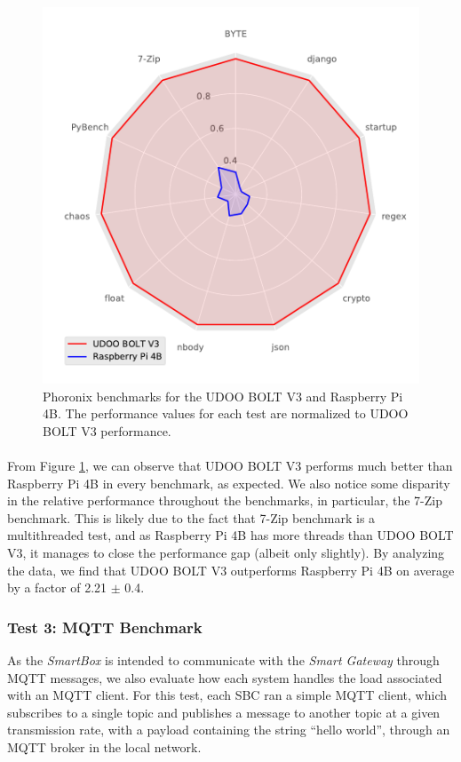 \begin{figure}[H]
    \centering
    \includegraphics[width=0.8 \linewidth]{images/phoronix-benchmarks.pdf}
    \caption [Phoronix benchmarks for the UDOO BOLT V3 and Raspberry Pi 4B.]{ Phoronix benchmarks for the UDOO BOLT V3 and Raspberry Pi 4B. The performance values for each test are normalized to UDOO BOLT V3 performance.}
    \label{fig:phronix-benchmarks}
\end{figure}

\paragraph{} From Figure \ref{fig:phronix-benchmarks}, we can observe that UDOO BOLT V3 performs much better than Raspberry Pi 4B in every benchmark, as expected. We also notice some disparity in the relative performance throughout the benchmarks, in particular, the 7-Zip benchmark. This is likely due to the fact that 7-Zip benchmark is a multithreaded test, and as Raspberry Pi 4B has more threads than UDOO BOLT V3, it manages to close the performance gap (albeit only slightly). By analyzing the data, we find that UDOO BOLT V3 outperforms Raspberry Pi 4B on average by a factor of 2.21 $\pm$ 0.4.

\subsubsection{Test 3: \acs{MQTT} Benchmark}

As the \textit{SmartBox} is intended to communicate with the \textit{Smart Gateway} through \acs{MQTT} messages, we also evaluate how each system handles the load associated with an \acs{MQTT} client. For this test, each \acs{SBC} ran a simple \acs{MQTT} client, which subscribes to a single topic and publishes a message to another topic at a given transmission rate, with a payload containing the string ``hello world'', through an \acs{MQTT} broker in the local network.


